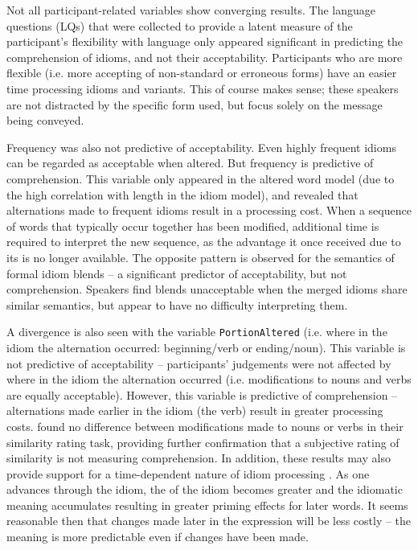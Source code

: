 \documentclass[output=paper
,modfonts
,nonflat]{langsci/langscibook}
\begin{document}
Not all participant-related variables show converging results. The language questions (LQs) that were collected to provide a latent measure of the participant's flexibility with language only appeared significant in predicting the comprehension of idioms, and not their acceptability. Participants who are more flexible (i.e. more accepting of non-standard or erroneous forms) have an easier time processing idioms and variants. This of course makes sense; these speakers are not distracted by the specific form used, but focus solely on the message being conveyed.  

Frequency was also not predictive of acceptability. Even highly frequent idioms can be regarded as acceptable when altered. But frequency is predictive of comprehension. This variable only appeared in the altered word model (due to the high correlation with length in the idiom model), and revealed that alternations made to frequent idioms result in a processing cost. When a sequence of words that typically occur together has been modified, additional time is required to interpret the new sequence, as the advantage it once received due to its  is no longer available. The opposite pattern is observed for the semantics of formal idiom blends -- a significant predictor of acceptability, but not comprehension. Speakers find blends unacceptable when the merged idioms share similar semantics, but appear to have no difficulty interpreting them.

A divergence is also seen with the variable \texttt{PortionAltered} (i.e. where in the idiom the alternation occurred: beginning/verb or ending/noun). This variable is not predictive of acceptability -- participants' judgements were not affected by where in the idiom the alternation occurred (i.e. modifications to nouns and verbs are equally acceptable). However, this variable is predictive of comprehension -- alternations made earlier in the idiom (the verb) result in greater processing costs. \citet{GibbsEtAl1989} found no difference between modifications made to nouns or verbs in their similarity rating task, providing further confirmation that a subjective rating of similarity is not measuring comprehension. In addition, these results may also provide support for a time-dependent nature of idiom processing \citep{TitoneLibben2014}. As one advances through the idiom, the  of the idiom becomes greater and the idiomatic meaning accumulates resulting in greater priming effects for later words. It seems reasonable then that changes made later in the expression will be less costly -- the meaning is more predictable even if changes have been made.
\end{document}
